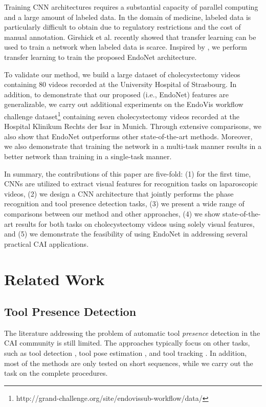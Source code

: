 \documentclass[journal]{IEEEtran} \usepackage{amssymb}
\begin{document}
Training CNN architectures requires a substantial capacity of parallel
computing and a large amount of labeled data. In the domain of medicine, labeled 
data is particularly difficult to obtain due to regulatory restrictions and 
the cost of manual annotation. Girshick et al. \cite{girshick_cvpr2014} recently 
showed that transfer learning can be 
used to train a network when labeled data is scarce. Inspired by \cite{girshick_cvpr2014}, we 
perform transfer learning to train the proposed EndoNet architecture.

To validate our method, we build a large dataset of cholecystectomy
videos containing 80 videos recorded at the University Hospital of Strasbourg. In addition, to demonstrate
that our proposed (i.e., EndoNet) features are generalizable, we carry out additional experiments 
on the EndoVis workflow challenge dataset\footnote{http://grand-challenge.org/site/endovissub-workflow/data/} containing seven cholecystectomy videos recorded at the Hospital Klinikum Rechts der Isar in Munich. Through extensive comparisons, we also show that EndoNet outperforms other state-of-the-art methods. Moreover, we also demonstrate
that training the network in a multi-task manner results in a better network than training in a single-task manner.

In summary, the contributions of this paper are five-fold: (1)
for the first time, CNNs are utilized to extract visual features for
recognition tasks on laparoscopic videos, (2) we design a CNN architecture
that jointly performs the phase recognition and tool presence detection
tasks, (3) we present a wide range of comparisons between our method and other approaches, (4) we show state-of-the-art results for
both tasks on cholecystectomy videos using solely visual features, and (5) we demonstrate the feasibility of using EndoNet in addressing several practical CAI applications.


\section{Related Work}


\subsection{Tool Presence Detection\label{sub:Tool-Presence-Detection}}

The literature addressing the problem of automatic tool \textit{presence}
detection in the CAI community is
still limited. The approaches typically
focus on other tasks, such as tool detection \cite{sznitman_miccai2014,bouget_tmi2015},
tool pose estimation \cite{allan_miccai2015}, and tool tracking 
\cite{rieke_miccai2015,reiter_miccai2012}. In addition, most of the methods are only 
tested on short sequences, while we carry out the task on the complete procedures.
\end{document}
